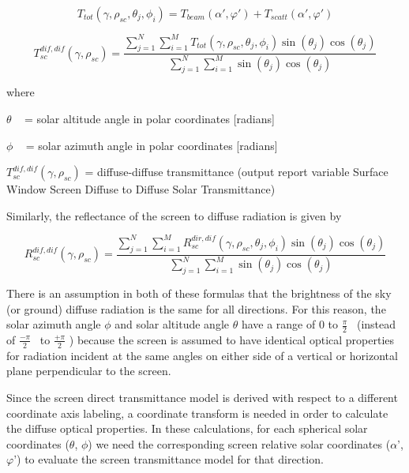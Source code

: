 \begin{equation}
{T_{tot}}(\gamma ,{\rho_{sc}},{\theta_j},{\phi_i}) = {T_{beam}}\left( {\alpha ',\varphi '} \right) + {T_{scatt}}\left( {\alpha ',\varphi '} \right)
\end{equation}

\begin{equation}
T_{sc}^{dif,dif}(\gamma ,{\rho_{sc}}) = \frac{{\sum\limits_{j = 1}^N {\sum\limits_{i = 1}^M {{T_{tot}}(\gamma ,{\rho_{sc}},{\theta_j},{\phi_i})\sin ({\theta_j})\cos ({\theta_j})} } }}{{\sum\limits_{j = 1}^N {\sum\limits_{i = 1}^M {\sin ({\theta_j})\cos ({\theta_j})} } }}
\end{equation}

where

\(\theta\) ~ = solar altitude angle in polar coordinates {[}radians{]}

\(\phi\) ~ = solar azimuth angle in polar coordinates {[}radians{]}

\(T_{sc}^{dif,dif}(\gamma ,{\rho_{sc}})\) = diffuse-diffuse transmittance (output report variable Surface Window Screen Diffuse to Diffuse Solar Transmittance)

Similarly, the reflectance of the screen to diffuse radiation is given by

\begin{equation}
R_{sc}^{dif,dif}(\gamma ,{\rho_{sc}}) = \frac{{\sum\limits_{j = 1}^N {\sum\limits_{i = 1}^M {R_{sc}^{dir,dif}(\gamma ,{\rho_{sc}},{\theta_j},{\phi_i})\sin ({\theta_j})\cos ({\theta_j})} } }}{{\sum\limits_{j = 1}^N {\sum\limits_{i = 1}^M {\sin ({\theta_j})\cos ({\theta_j})} } }}
\end{equation}

There is an assumption in both of these formulas that the brightness of the sky (or ground) diffuse radiation is the same for all directions. For this reason, the solar azimuth angle \(\phi\) and solar altitude angle \(\theta\) have a range of 0 to \({\frac{\pi}{2}}\) ~(instead of \({\frac{{ - \pi }}{2}}\) ~to \({\frac{{ + \pi }}{2}}\) ) because the screen is assumed to have identical optical properties for radiation incident at the same angles on either side of a vertical or horizontal plane perpendicular to the screen.

Since the screen direct transmittance model is derived with respect to a different coordinate axis labeling, a coordinate transform is needed in order to calculate the diffuse optical properties. In these calculations, for each spherical solar coordinates (\(\theta\), \(\phi\)) we need the corresponding screen relative solar coordinates (\(\alpha\)', \(\varphi\)') to evaluate the screen transmittance model for that direction.

